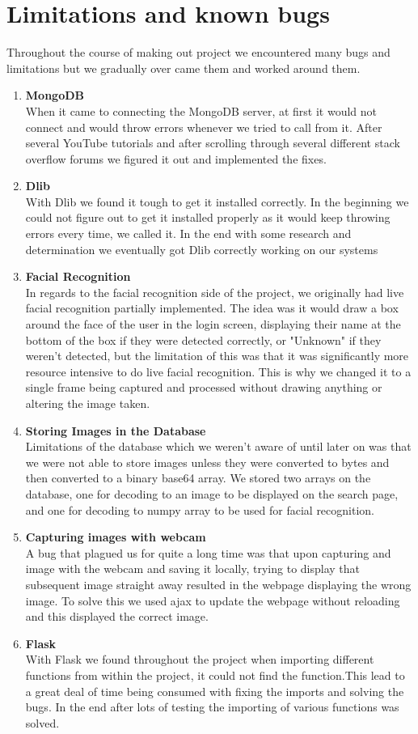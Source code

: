 \documentclass{article}
\begin{document}
\section{Limitations and known bugs}
Throughout the course of making out project we encountered many bugs and limitations but we gradually over came them and worked around them.
\begin{enumerate}
\item \textbf{MongoDB} \\
When it came to connecting the MongoDB server, at first it would not connect and would throw errors whenever we tried to call from it. After several YouTube tutorials and after scrolling through several different stack overflow forums we figured it out and implemented the fixes. 
\item \textbf{Dlib} \\
With Dlib we found it tough to get it installed correctly. In the beginning we could not figure out to get it installed properly as it would keep throwing errors every time, we called it. In the end with some research and determination we eventually got Dlib correctly working on our systems
\item \textbf{Facial Recognition} \\
In regards to the facial recognition side of the project, we originally had live facial recognition partially implemented. The idea was it would draw a box around the face of the user in the login screen, displaying their name at the bottom of the box if they were detected correctly, or "Unknown" if they weren't detected, but the limitation of this was that it was significantly more resource intensive to do live facial recognition. This is why we changed it to a single frame being captured and processed without drawing anything or altering the image taken.
\item \textbf{Storing Images in the Database} \\
Limitations of the database which we weren't aware of until later on was that we were not able to store images unless they were converted to bytes and then converted to a binary base64 array. We stored two arrays on the database, one for decoding to an image to be displayed on the search page, and one for decoding to numpy array to be used for facial recognition.
\item \textbf{Capturing images with webcam} \\
A bug that plagued us for quite a long time was that upon capturing and image with the webcam and saving it locally, trying to display that subsequent image straight away resulted in the webpage displaying the wrong image. To solve this we used ajax to update the webpage without reloading and this displayed the correct image.
\item \textbf{Flask} \\
With Flask we found throughout the project when importing different functions from within the project, it could not find the function.This lead to a great deal of time being consumed with fixing the imports and solving the bugs. In the end after lots of testing the importing of various functions was solved.

\end{enumerate}
\end{document}
